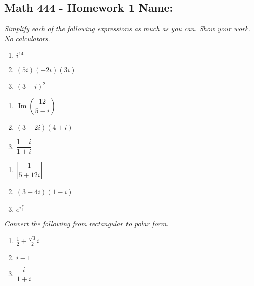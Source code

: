 \documentclass[11pt]{article}
\newcommand{\im}{\operatorname{Im}}
\begin{document}
\pagestyle{empty}
\subsection*{Math 444 - Homework 1 \hfill Name: \underline{\hspace*{2in}}}
\textit{Simplify each of the following expressions as much as you can. Show your work. No calculators.} 
\begin{multicols}{3}
\begin{enumerate}
\item $i^{14}$
\item $(5i)(-2i)(3i)$ 
\item $(3+i)^2$
\setcounter{enumCount}{\theenumi}
\end{enumerate}
\end{multicols}
\vfill

\begin{multicols}{3}
\begin{enumerate}
\setcounter{enumi}{\theenumCount}
\item $\im \left(\dfrac{12}{5 - i}\right)$
\item $(3-2i)(4+i)$
\item $\dfrac{1-i}{1+i}$
\setcounter{enumCount}{\theenumi}
\end{enumerate}
\end{multicols}
\vfill

\begin{multicols}{3}
\begin{enumerate}
\setcounter{enumi}{\theenumCount}
\item $ \left|\dfrac{1}{5 + 12i}\right|$
\item $\overline{(3+4i)(1-i)}$
\item $\overline{e^{i\frac{\pi}{3}}}$
\setcounter{enumCount}{\theenumi}
\end{enumerate}
\end{multicols}
\vfill

\noindent
\textit{Convert the following from rectangular to polar form.}
\begin{multicols}{3}
\begin{enumerate}
\setcounter{enumi}{\theenumCount}
\item $\tfrac{1}{2} + \tfrac{\sqrt{3}}{2}i$
\item $i-1$
\item $\dfrac{i}{1+i}$
\setcounter{enumCount}{\theenumi}
\end{enumerate}
\end{multicols}
\vfill
\end{document}

